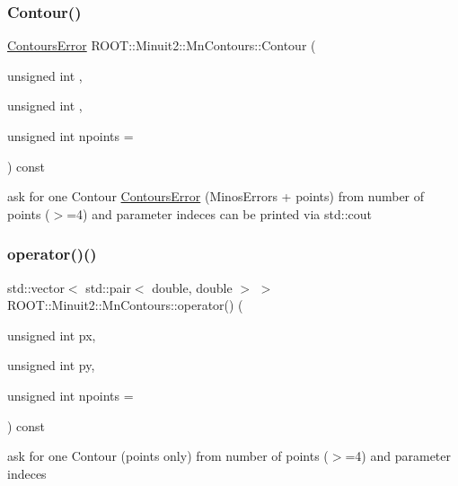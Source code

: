 \mbox{\label{classROOT_1_1Minuit2_1_1MnContours_a8bcd5be6a72acc39c1b56fd45e9958ba}} 
\subsubsection{\texorpdfstring{Contour()}{Contour()}\hspace{0.1cm}{\footnotesize\ttfamily [2/2]}}
{\footnotesize\ttfamily \mbox{\hyperlink{classROOT_1_1Minuit2_1_1ContoursError}{Contours\+Error}} R\+O\+O\+T\+::\+Minuit2\+::\+Mn\+Contours\+::\+Contour (\begin{DoxyParamCaption}\item[{unsigned int}]{,  }\item[{unsigned int}]{,  }\item[{unsigned int}]{npoints = {} }\end{DoxyParamCaption}) const}

ask for one Contour \mbox{\hyperlink{classROOT_1_1Minuit2_1_1ContoursError}{Contours\+Error}} (Minos\+Errors + points) from number of points ($>$=4) and parameter indeces can be printed via std\+::cout \mbox{\label{classROOT_1_1Minuit2_1_1MnContours_a8a56508ee3dd6f22b7378acf8286debe}} 
\subsubsection{\texorpdfstring{operator()()}{operator()()}\hspace{0.1cm}{\footnotesize\ttfamily [1/2]}}
{\footnotesize\ttfamily std\+::vector$<$ std\+::pair$<$ double, double $>$ $>$ R\+O\+O\+T\+::\+Minuit2\+::\+Mn\+Contours\+::operator() (\begin{DoxyParamCaption}\item[{unsigned int}]{px,  }\item[{unsigned int}]{py,  }\item[{unsigned int}]{npoints = {} }\end{DoxyParamCaption}) const}



ask for one Contour (points only) from number of points ($>$=4) and parameter indeces 

